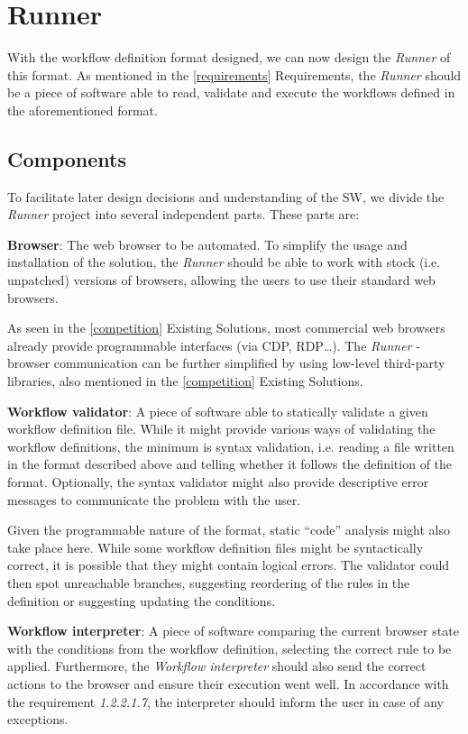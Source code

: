 \section{Runner}

With the workflow definition format designed, we can now design the \textit{Runner} of this format.
As mentioned in the \autoref{requirements} Requirements, the \textit{Runner} should be a piece of software able to read, validate and execute the workflows defined in the aforementioned format.

\subsection{Components}

To facilitate later design decisions and understanding of the \ac{SW}, we divide the \textit{Runner} project into several independent parts.
These parts are:

\emptyline
\textbf{Browser}:  
The web browser to be automated.
To simplify the usage and installation of the solution, the \textit{Runner} should be able to work with stock (i.e. unpatched) versions of browsers, allowing the users to use their standard web browsers.

As seen in the \autoref{competition} Existing Solutions, most commercial web browsers already provide programmable interfaces (via CDP, RDP\dots).
The \textit{Runner} - browser communication can be further simplified by using low-level third-party libraries, also mentioned in the \autoref{competition} Existing Solutions.

\emptyline
\textbf{Workflow validator}:
A piece of software able to statically validate a given workflow definition file.
While it might provide various ways of validating the workflow definitions, the minimum is syntax validation, i.e. reading a file written 
in the format described above and telling whether it follows the definition of the format.
Optionally, the syntax validator might also provide descriptive error messages to communicate the problem with the user.

Given the programmable nature of the format, static ``code'' analysis might also take place here. 
While some workflow definition files might be syntactically correct, it is possible that they might contain logical errors.
The validator could then spot unreachable branches, suggesting reordering of the rules in the definition or suggesting updating the conditions.

\emptyline
\textbf{Workflow interpreter}:  
A piece of software comparing the current browser state with the conditions from the workflow definition, selecting the correct rule to be applied.
Furthermore, the \textit{Workflow interpreter} should also send the correct actions to the browser and ensure their execution went well.
In accordance with the requirement \textit{1.2.2.1.7}, the interpreter should inform the user in case of any exceptions.

